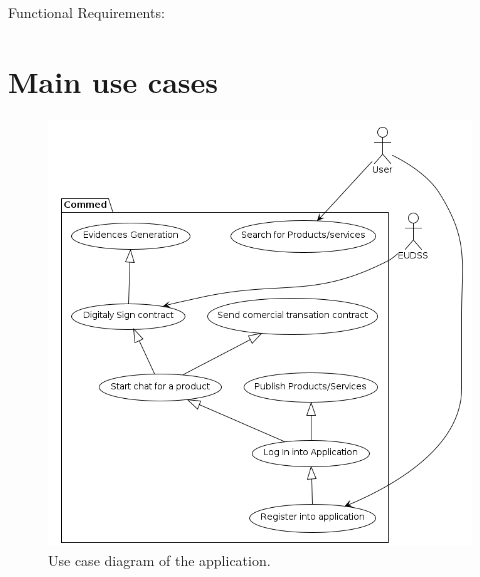 \documentclass[./main.tex]{subfiles}
\begin{document}
Functional Requirements:

\section{Main use cases}

\begin{figure}[h]
\centering
\includegraphics[width=\linewidth]{use_case_diagram/usecase_diagram.png}
\caption{Use case diagram of the application.}
\end{figure}
\end{document}
